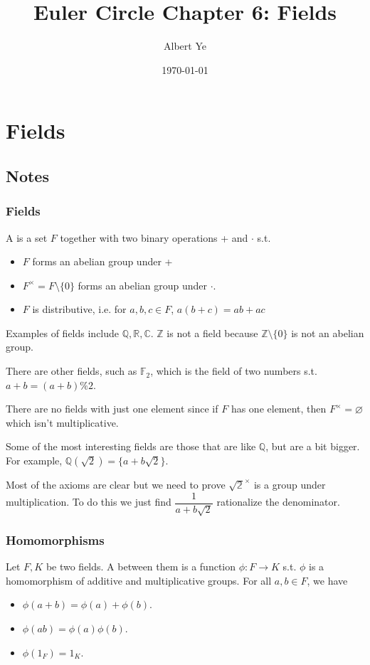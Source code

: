 \documentclass{scrartcl}
\title{Euler Circle Chapter 6: Fields}
\author{Albert Ye}
\date{\today}
\begin{document}
\maketitle
\section{Fields}
\subsection{Notes}
\subsubsection{Fields}
\begin{definition}
	A  is a set $F$ together with two binary operations + and $\cdot$ s.t.
	\begin{itemize}
		\item $F$ forms an abelian group under +
		\item $F^\times = F \setminus \{0\}$ forms an abelian group under $\cdot$.
		\item $F$ is distributive, i.e. for $a, b, c \in F$, $a(b+c) = ab + ac$
	\end{itemize}
	Examples of fields include $\mathbb{Q}, \mathbb{R}, \mathbb{C}$. $\mathbb{Z}$ is not a field because $\mathbb{Z} \setminus \{0\}$ is not an abelian group.
\end{definition}

There are other fields, such as $\mathbb{F}_2$, which is the field of two numbers s.t. $a + b = (a + b) \% 2$.

\begin{note}
	There are no fields with just one element since if $F$ has one element, then $F^\times = \varnothing$ which isn't multiplicative.
\end{note}

Some of the most interesting fields are those that are like $\mathbb{Q}$, but are a bit bigger. For example, $\mathbb{Q}(\sqrt{2}) = \{a+b\sqrt{2}\}$.

Most of the axioms are clear but we need to prove $\mathbb{\sqrt{2}}^\times$ is a group under multiplication. To do this we just find $\dfrac{1}{a+b\sqrt{2}}$ rationalize the denominator.

\subsubsection{Homomorphisms}
\begin{definition}
	Let $F, K$ be two fields. A  between them is a function $\phi : F \rightarrow K$ s.t. $\phi$ is a homomorphism of additive and multiplicative groups. For all $a,b \in F$, we have
	\begin{itemize}
		\item $\phi(a+b) = \phi(a) + \phi(b)$.
		\item $\phi(ab) = \phi(a)\phi(b)$.
		\item $\phi(1_F) = 1_K$.
	\end{itemize}
\end{definition}
\end{document}
